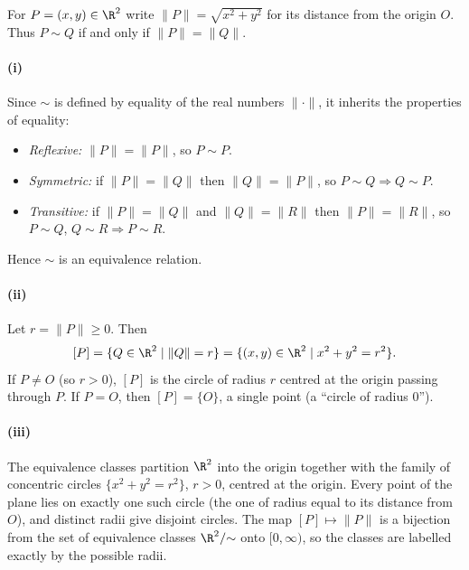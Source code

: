 
For $P=(x,y)\in\R^2$ write $\lVert P\rVert=\sqrt{x^2+y^2}$ for its distance from the origin $O$.
Thus $P\sim Q$ if and only if $\lVert P\rVert=\lVert Q\rVert$.

\paragraph{(i)} Since $\sim$ is defined by equality of the real numbers $\lVert\cdot\rVert$, it
inherits the properties of equality:
\begin{itemize}
  \item \emph{Reflexive:} $\lVert P\rVert=\lVert P\rVert$, so $P\sim P$.
  \item \emph{Symmetric:} if $\lVert P\rVert=\lVert Q\rVert$ then $\lVert Q\rVert=\lVert P\rVert$,
        so $P\sim Q\Rightarrow Q\sim P$.
  \item \emph{Transitive:} if $\lVert P\rVert=\lVert Q\rVert$ and $\lVert Q\rVert=\lVert R\rVert$
        then $\lVert P\rVert=\lVert R\rVert$, so $P\sim Q$, $Q\sim R\Rightarrow P\sim R$.
\end{itemize}
Hence $\sim$ is an equivalence relation.

\paragraph{(ii)} Let $r=\lVert P\rVert\ge 0$. Then
\[ [P]=\{Q\in\R^2\mid \lVert Q\rVert=r\}=\{(x,y)\in\R^2\mid x^2+y^2=r^2\}. \]
If $P\neq O$ (so $r>0$), $[P]$ is the circle of radius $r$ centred at the origin passing
through $P$. If $P=O$, then $[P]=\{O\}$, a single point (a ``circle of radius $0$'').

\paragraph{(iii)} The equivalence classes partition $\R^2$ into the origin together with the
family of concentric circles $\{x^2+y^2=r^2\}$, $r>0$, centred at the origin. Every point of
the plane lies on exactly one such circle (the one of radius equal to its distance from $O$),
and distinct radii give disjoint circles. The map $[P]\mapsto\lVert P\rVert$ is a bijection
from the set of equivalence classes $\R^2/{\sim}$ onto $[0,\infty)$, so the classes are
labelled exactly by the possible radii.
